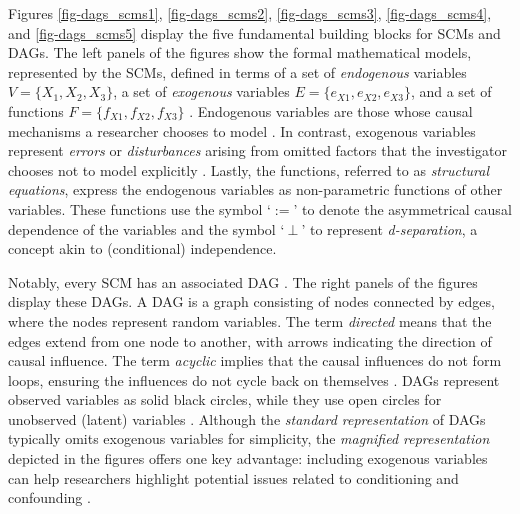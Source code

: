 \documentclass[
  authoryear,
  review,
  1p]{elsarticle}
\begin{document}
Figures \ref{fig-dags_scms1}, \ref{fig-dags_scms2},
\ref{fig-dags_scms3}, \ref{fig-dags_scms4}, and \ref{fig-dags_scms5}
display the five fundamental building blocks for SCMs and DAGs. The left
panels of the figures show the formal mathematical models, represented
by the SCMs, defined in terms of a set of \emph{endogenous} variables
\(V=\{X_{1},X_{2},X_{3}\}\), a set of \emph{exogenous} variables
\(E=\{e_{X1},e_{X2},e_{X3}\}\), and a set of functions
\(F=\{f_{X1},f_{X2},f_{X3}\}\) \citep{Pearl_2009, Cinelli_et_al_2020}.
Endogenous variables are those whose causal mechanisms a researcher
chooses to model \citep{Neal_2020}. In contrast, exogenous variables
represent \emph{errors} or \emph{disturbances} arising from omitted
factors that the investigator chooses not to model explicitly
\citep[pp.~27,68]{Pearl_2009}. Lastly, the functions, referred to as
\emph{structural equations}, express the endogenous variables as
non-parametric functions of other variables. These functions use the
symbol `\(:=\)' to denote the asymmetrical causal dependence of the
variables and the symbol `\(\:\bot\:\)' to represent
\emph{d-separation}, a concept akin to (conditional) independence.

Notably, every SCM has an associated DAG
\citep{Pearl_et_al_2016, Cinelli_et_al_2020}. The right panels of the
figures display these DAGs. A DAG is a graph consisting of nodes
connected by edges, where the nodes represent random variables. The term
\emph{directed} means that the edges extend from one node to another,
with arrows indicating the direction of causal influence. The term
\emph{acyclic} implies that the causal influences do not form loops,
ensuring the influences do not cycle back on themselves
\citep{McElreath_2020}. DAGs represent observed variables as solid black
circles, while they use open circles for unobserved (latent) variables
\citep{Morgan_et_al_2014}. Although the \emph{standard representation}
of DAGs typically omits exogenous variables for simplicity, the
\emph{magnified representation} depicted in the figures offers one key
advantage: including exogenous variables can help researchers highlight
potential issues related to conditioning and confounding
\citep{Cinelli_et_al_2020}.
\end{document}
